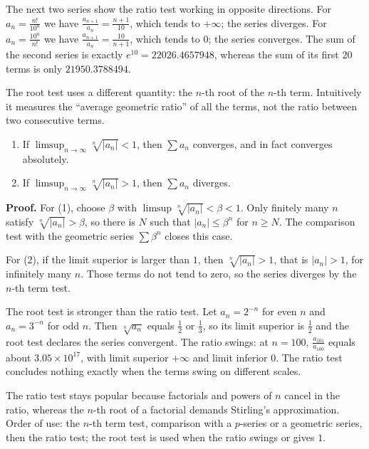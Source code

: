 The next two series show the ratio test working in opposite directions. For
$a_n = \frac{n!}{10^n}$ we have $\frac{a_{n+1}}{a_n} = \frac{n+1}{10}$, which tends to
$+\infty$; the series diverges. For $a_n = \frac{10^n}{n!}$ we have
$\frac{a_{n+1}}{a_n} = \frac{10}{n+1}$, which tends to $0$; the series converges. The sum
of the second series is exactly $e^{10} = 22026.4657948$, whereas the sum of its first $20$
terms is only $21950.3788494$.

The root test uses a different quantity: the $n$-th root of the $n$-th
term. Intuitively it measures the ``average geometric ratio'' of all the terms, not the
ratio between two consecutive terms.

\begin{teorema}
\begin{enumerate}
\item If $\limsup_{n\to\infty} \sqrt[n]{|a_n|} < 1$, then $\sum a_n$ converges, and in
      fact converges absolutely.
\item If $\limsup_{n\to\infty} \sqrt[n]{|a_n|} > 1$, then $\sum a_n$ diverges.
\end{enumerate}
\end{teorema}

\noindent\textbf{Proof.} For (1), choose $\beta$ with
$\limsup \sqrt[n]{|a_n|} < \beta < 1$. Only finitely many $n$ satisfy
$\sqrt[n]{|a_n|} > \beta$, so there is $N$ such that $|a_n| \le \beta^n$ for $n \ge N$. The
comparison test with the geometric series $\sum \beta^n$ closes this case.

For (2), if the limit superior is larger than $1$, then $\sqrt[n]{|a_n|} > 1$, that is
$|a_n| > 1$, for infinitely many $n$. Those terms do not tend to zero, so the series
diverges by the $n$-th term test.

The root test is stronger than the ratio test. Let $a_n = 2^{-n}$ for even $n$ and
$a_n = 3^{-n}$ for odd $n$. Then $\sqrt[n]{a_n}$ equals $\tfrac{1}{2}$ or $\tfrac{1}{3}$,
so its limit superior is $\tfrac{1}{2}$ and the root test declares the series convergent.
The ratio swings: at $n=100$, $\frac{a_{101}}{a_{100}}$ equals about
$3.05 \times 10^{17}$, with limit superior $+\infty$ and limit inferior $0$. The ratio test
concludes nothing exactly when the terms swing on different scales.

The ratio test stays popular because factorials and powers of $n$ cancel in the ratio,
whereas the $n$-th root of a factorial demands Stirling's approximation. Order of use: the
$n$-th term test, comparison with a $p$-series or a geometric series, then the ratio test;
the root test is used when the ratio swings or gives $1$.

